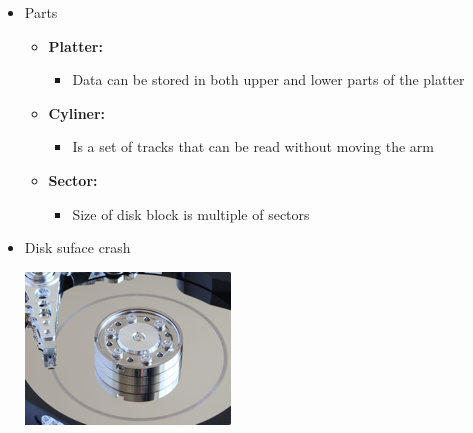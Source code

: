 \documentclass[12pt]{article}
\begin{document}
\begin{enumerate}[1.]
    \begin{itemize}
        \item Parts
        \begin{itemize}
            \item \textbf{Platter:}
            \begin{itemize}
                \item Data can be stored in both upper and lower parts of the platter
            \end{itemize}
            \item \textbf{Cyliner:}
            \begin{itemize}
                \item Is a set of tracks that can be read without moving the arm
            \end{itemize}
            \item \textbf{Sector:}
            \begin{itemize}
                \item Size of disk block is multiple of sectors
            \end{itemize}
        \end{itemize}
        \item Disk suface crash
        \begin{center}
        \includegraphics[width=0.4\linewidth]{images/notes_5.png}
        \end{center}


\end{itemize}
\end{enumerate}
\end{document}
